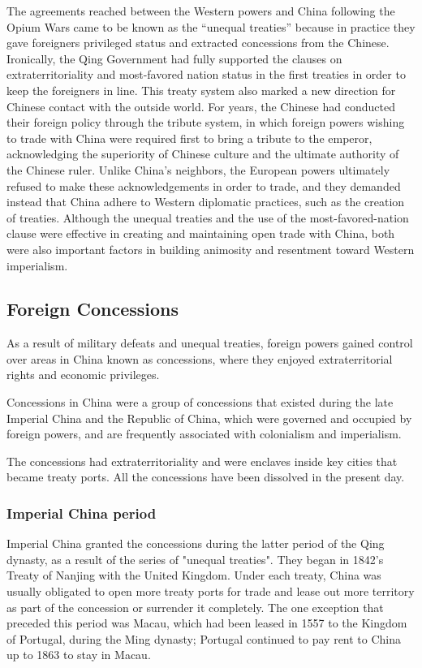 The agreements reached between the Western powers and China following the 
Opium Wars came to be known as the “unequal treaties” because in practice 
they gave foreigners privileged status and extracted concessions from the 
Chinese. Ironically, the Qing Government had fully supported the clauses 
on extraterritoriality and most-favored nation status in the first treaties 
in order to keep the foreigners in line. This treaty system also marked a 
new direction for Chinese contact with the outside world. For years, the 
Chinese had conducted their foreign policy through the tribute system, in 
which foreign powers wishing to trade with China were required first to 
bring a tribute to the emperor, acknowledging the superiority of Chinese 
culture and the ultimate authority of the Chinese ruler. Unlike China's 
neighbors, the European powers ultimately refused to make these 
acknowledgements in order to trade, and they demanded instead that China 
adhere to Western diplomatic practices, such as the creation of treaties. 
Although the unequal treaties and the use of the most-favored-nation 
clause were effective in creating and maintaining open trade with China, 
both were also important factors in building animosity and resentment 
toward Western imperialism.

\subsection{Foreign Concessions}

As a result of military defeats and unequal treaties, foreign powers gained 
control over areas in China known as concessions, where they enjoyed 
extraterritorial rights and economic privileges.

Concessions in China were a group of concessions that existed during the 
late Imperial China and the Republic of China, which were governed and 
occupied by foreign powers, and are frequently associated with colonialism 
and imperialism.

The concessions had extraterritoriality and were enclaves inside key cities 
that became treaty ports. All the concessions have been dissolved in the 
present day.

\subsubsection{Imperial China period}

Imperial China granted the concessions during the latter period of the Qing 
dynasty, as a result of the series of "unequal treaties". They began in 1842's 
Treaty of Nanjing with the United Kingdom. Under each treaty, China was 
usually obligated to open more treaty ports for trade and lease out more 
territory as part of the concession or surrender it completely. The one 
exception that preceded this period was Macau, which had been leased in 
1557 to the Kingdom of Portugal, during the Ming dynasty; Portugal continued 
to pay rent to China up to 1863 to stay in Macau.


